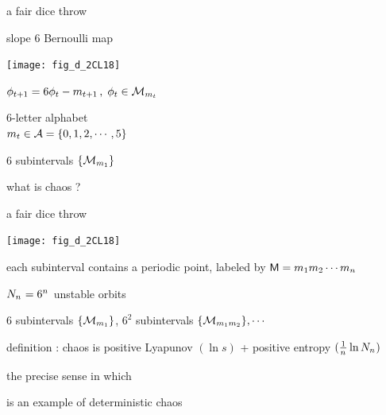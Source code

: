 \renewcommand{\ssp}{\ensuremath{\phi}}             %
\begin{frame}{a fair dice throw}
    \begin{block}{slope ${6}$ Bernoulli map}
\begin{center}
            \begin{minipage}[c]{0.32\textwidth}\begin{center}
\texttt{[image: fig\_d\_2CL18]}
            \end{center}\end{minipage}
            \hspace{2ex}
            \begin{minipage}[c]{0.46\textwidth}
\(
\ssp_{\zeit+1}
= {6} \ssp_{\zeit} - \Ssym{\zeit+1}
\,,\;  \ssp_{\zeit}\in\pS_{\Ssym{\zeit}}
\)
\medskip

${6}$-letter alphabet \\
\(
{m_{t}} \in \mathcal{A}=\{0,1,2,\cdots,5\}
\)
            \end{minipage}
\end{center}
$6$ subintervals $\{{\cal M}_{{m_{1}}}\}$
    \end{block}
\end{frame}

\begin{frame}{what is chaos ?}
    \begin{block}{a fair dice throw}
\begin{center}
            \begin{minipage}[c]{0.32\textwidth}\begin{center}
\texttt{[image: fig\_d\_2CL18]}
            \end{center}\end{minipage}
            \hspace{2ex}
            \begin{minipage}[c]{0.46\textwidth}
each subinterval contains a periodic point,
labeled by
$\mathsf{M}={m_{1}}{m_{2}}\cdots{\ensuremath{m_{{n_{}}}}}$
\bigskip

$N_{n_{}} = 6^{n_{}}$ {\color{red}unstable} orbits
            \end{minipage}
\end{center}
$6$ subintervals $\{{\cal M}_{{m_{1}}}\}$,
$6^2$ subintervals $\{{\cal M}_{{m_{1}}{m_{2}}}\}, \cdots$
    \end{block}
    \begin{block}{definition : chaos is}
positive Lyapunov $(\ln s)$ + positive entropy $(\frac{1}{{n_{}}}\ln N_{n_{}})$
    \end{block}
the precise sense in which

\hfill
{}
is an example of deterministic chaos
\end{frame}

